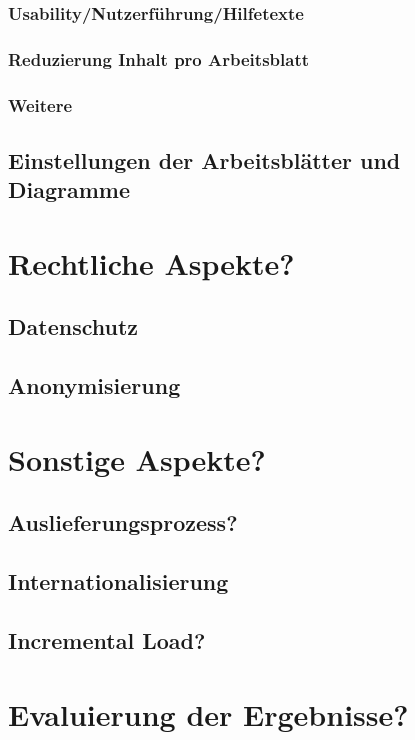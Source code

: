 \subsubsection{Usability/Nutzerführung/Hilfetexte}
\subsubsection{Reduzierung Inhalt pro Arbeitsblatt}
\subsubsection{Weitere}

\subsection{Einstellungen der Arbeitsblätter und Diagramme}

\section{Rechtliche Aspekte?}
\subsection{Datenschutz}
\subsection{Anonymisierung}


\section{Sonstige Aspekte?}
\subsection{Auslieferungsprozess?}
\subsection{Internationalisierung}
\subsection{Incremental Load?}


\section{Evaluierung der Ergebnisse?}
